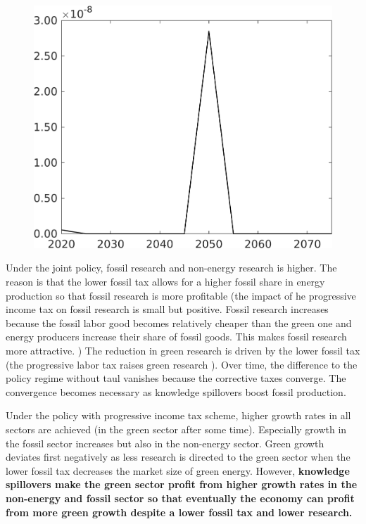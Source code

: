 \documentclass[12pt]{article}
\begin{document}
\begin{figure}[h!!]
\begin{minipage}[]{0.32\textwidth}
\end{minipage}	
\begin{minipage}[]{0.32\textwidth}
\includegraphics[width=1\textwidth]{../../codding_model/own_basedOnFried/optimalPol_010922_revision/figures/all_13Sept22/CompTaufPER_bytaul_Reg0_F_spillover0_nsk0_xgr0_knspil0_sep0_LFlimit1_emsbase0_countec0_GovRev0_etaa0.79_lgd0.png}
\end{minipage}	
\end{figure}
Under the joint policy, fossil research and non-energy research is higher. The reason is that the lower fossil tax allows for a higher fossil share in energy production so that fossil research is more profitable (the impact of he progressive income tax on fossil research is small but positive. Fossil research increases because the fossil labor good becomes relatively cheaper than the green one and energy producers increase their share of fossil goods. This makes fossil research more attractive. ) The reduction in green research is driven by the lower fossil tax (the progressive labor tax raises green research ). Over time, the difference to the policy regime without taul vanishes because the corrective taxes converge. The convergence becomes necessary as knowledge spillovers boost fossil production. 

Under the policy with progressive income tax scheme, higher growth rates in all sectors are achieved (in the green sector after some time). Especially growth in the fossil sector increases but also in the non-energy sector. 
Green growth deviates first negatively as less research is directed to the green sector when the lower fossil tax decreases the market size of green energy. However, \textbf{knowledge spillovers make the green sector profit from higher growth rates in the non-energy and fossil sector so that eventually the economy can profit from more green growth despite a lower fossil tax and lower research.} 
\end{document}

